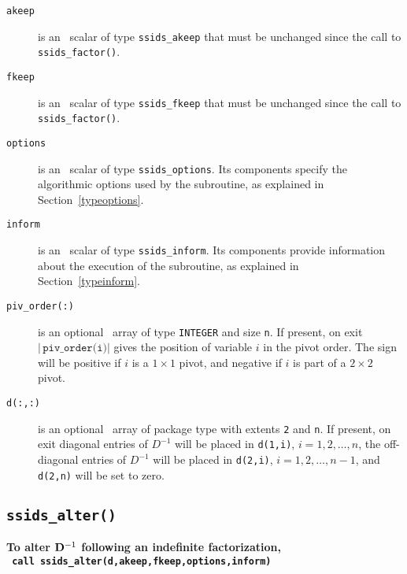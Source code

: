 \begin{description}

\item[\texttt{akeep}]  is an \intentin\ scalar of type {\tt ssids\_akeep} that
must be unchanged since the call to {\tt ssids\_factor()}.

\item[\texttt{fkeep}]  is an \intentin\ scalar of type {\tt ssids\_fkeep} that
must be unchanged since the call to {\tt ssids\_factor()}.

\item[\texttt{options}] is an \intentin\ scalar of type {\tt ssids\_options}.
Its components specify the algorithmic options used by the subroutine, as
explained in Section~\ref{typeoptions}.

\item[\texttt{inform}] is an \intentout\ scalar of type
{\tt ssids\_inform}. Its components provide information about the execution
of the subroutine, as explained in Section~\ref{typeinform}.

\item[\texttt{piv\_order(:)}] is an optional \intentout\ array of type
{\tt INTEGER} and size {\tt n}. If present, on exit
$|\,\texttt{piv\_order(i)}|$ gives the position of variable $i$ in the pivot
order. The sign will be positive if $i$ is a $1\times1$ pivot, and negative
if $i$ is part of a $2 \times 2$ pivot.

\item[\texttt{d(:,:)}] is an optional \intentout\ array of package type with
extents {\tt 2} and {\tt n}.
If present, on exit diagonal entries of ${D}^{-1}$ will be placed
in {\tt d(1,i)}, $i = 1,2,\ldots,n$,
the off-diagonal entries  of ${D}^{-1}$ will be placed in
{\tt d(2,i)}, $i = 1,2,\ldots,n-1$, and
{\tt d(2,n)} will be set to zero.

\end{description}



\subsection{\texttt{ssids\_alter()}}
\textbf{To alter ${\bf D}^{-1}$ following an indefinite factorization,
   \vspace*{0.1cm} \\
   \texttt{ \hspace*{0.2cm}
      call ssids\_alter(d,akeep,fkeep,options,inform)
   }
}

